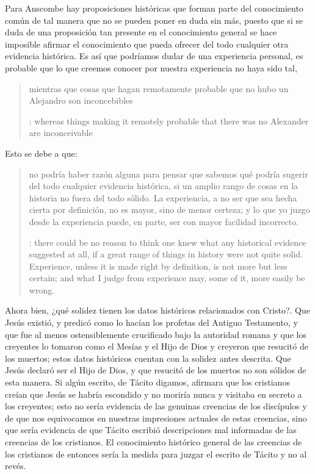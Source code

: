 Para Anscombe hay proposiciones históricas que forman parte del conocimiento
común de tal manera que no se pueden poner en duda sin más, puesto que si se
duda de una proposición tan presente en el conocimiento general se hace
imposible afirmar el conocimiento que pueda ofrecer del todo cualquier otra
evidencia histórica. Es así que podríamos dudar de una experiencia personal, es
probable que lo que creemos conocer por nuestra experiencia no haya sido tal,
\blockquote[{\cite[27]{anscombe2008faith:prophandmi}}: whereas things making it
remotely probable that there was no Alexander are inconceivable]{mientras que
  cosas que hagan remotamente probable que no hubo un Alejandro son
  inconcebibles}. Esto se debe a que:
\blockquote[{\cite[27]{anscombe2008faith:prophandmi}}: there could be no reason
to think one knew what any historical evidence suggested at all, if a great
range of things in history were not quite solid. Experience, unless it is made
right by definition, is not more but less certain; and what I judge from
experience may, some of it, more easily be wrong.]{no podría haber razón alguna
  para pensar que sabemos qué podría sugerir del todo cualquier evidencia
  histórica, si un amplio rango de cosas en la historia no fuera del todo
  sólido. La experiencia, a no ser que sea hecha cierta por definición, no es
  mayor, sino de menor certeza; y lo que yo juzgo desde la experiencia puede, en
  parte, ser con mayor facilidad incorrecto.}

Ahora bien, ¿qué solidez tienen los datos históricos relacionados con Cristo?.
Que Jesús existió, y predicó como lo hacían los profetas del Antiguo Testamento,
y que fue al menos ostensiblemente crucificado bajo la autoridad romana y que
los creyentes lo tomaron como el Mesías y el Hijo de Dios y creyeron que
resucitó de los muertos; estos datos históricos cuentan con la solidez antes
descrita. Que Jesús declaró ser el Hijo de Dios, y que resucitó de los muertos
no son sólidos de esta manera. Si algún escrito, de Tácito digamos, afirmara que
los cristianos creían que Jesús se habría escondido y no moriría nunca y
visitaba en secreto a los creyentes; esto no sería evidencia de las genuinas
creencias de los discípulos y de que nos equivocamos en nuestras impresiones
actuales de estas creencias, sino que sería evidencia de que Tácito escribió
descripciones mal informadas de las creencias de los cristianos. El conocimiento
histórico general de las creencias de los cristianos de entonces sería la medida
para juzgar el escrito de Tácito y no al revés.

